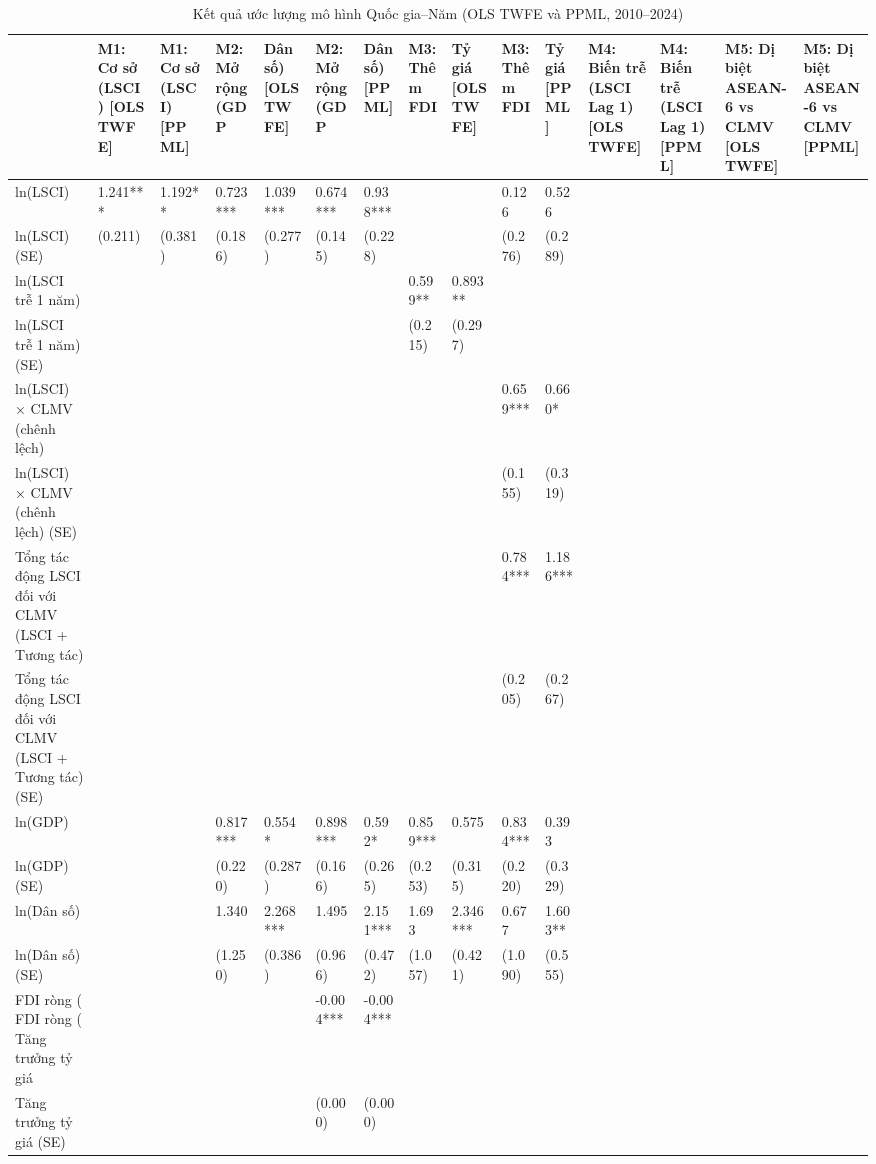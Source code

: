 \begin{table}
\caption{Kết quả ước lượng mô hình Quốc gia--Năm (OLS TWFE và PPML, 2010--2024)}
\label{tab:country_panel}
\begin{tabular}{lllllllllll}
\toprule
 & M1: Cơ sở (LSCI)
[OLS TWFE] & M1: Cơ sở (LSCI)
[PPML] & M2: Mở rộng (GDP & Dân số)
[OLS TWFE] & M2: Mở rộng (GDP & Dân số)
[PPML] & M3: Thêm FDI & Tỷ giá
[OLS TWFE] & M3: Thêm FDI & Tỷ giá
[PPML] & M4: Biến trễ (LSCI Lag 1)
[OLS TWFE] & M4: Biến trễ (LSCI Lag 1)
[PPML] & M5: Dị biệt ASEAN-6 vs CLMV
[OLS TWFE] & M5: Dị biệt ASEAN-6 vs CLMV
[PPML] \\
\midrule
ln(LSCI) & 1.241*** & 1.192** & 0.723*** & 1.039*** & 0.674*** & 0.938*** &  &  & 0.126 & 0.526 \\
ln(LSCI) (SE) & (0.211) & (0.381) & (0.186) & (0.277) & (0.145) & (0.228) &  &  & (0.276) & (0.289) \\
ln(LSCI trễ 1 năm) &  &  &  &  &  &  & 0.599** & 0.893** &  &  \\
ln(LSCI trễ 1 năm) (SE) &  &  &  &  &  &  & (0.215) & (0.297) &  &  \\
ln(LSCI) × CLMV (chênh lệch) &  &  &  &  &  &  &  &  & 0.659*** & 0.660* \\
ln(LSCI) × CLMV (chênh lệch) (SE) &  &  &  &  &  &  &  &  & (0.155) & (0.319) \\
Tổng tác động LSCI đối với CLMV (LSCI + Tương tác) &  &  &  &  &  &  &  &  & 0.784*** & 1.186*** \\
Tổng tác động LSCI đối với CLMV (LSCI + Tương tác) (SE) &  &  &  &  &  &  &  &  & (0.205) & (0.267) \\
ln(GDP) &  &  & 0.817*** & 0.554* & 0.898*** & 0.592* & 0.859*** & 0.575 & 0.834*** & 0.393 \\
ln(GDP) (SE) &  &  & (0.220) & (0.287) & (0.166) & (0.265) & (0.253) & (0.315) & (0.220) & (0.329) \\
ln(Dân số) &  &  & 1.340 & 2.268*** & 1.495 & 2.151*** & 1.693 & 2.346*** & 0.677 & 1.603** \\
ln(Dân số) (SE) &  &  & (1.250) & (0.386) & (0.966) & (0.472) & (1.057) & (0.421) & (1.090) & (0.555) \\
FDI ròng (%
FDI ròng (%
Tăng trưởng tỷ giá &  &  &  &  & -0.004*** & -0.004*** &  &  &  &  \\
Tăng trưởng tỷ giá (SE) &  &  &  &  & (0.000) & (0.000) &  &  &  &  \\

\end{tabular}
\end{table}
